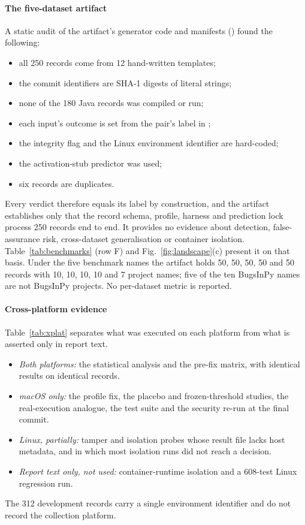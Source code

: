 \paragraph*{The five-dataset artifact} A static audit of the artifact's generator code and manifests () found the following:
\begin{itemize}
\item all 250 records come from 12 hand-written templates;
\item the commit identifiers are SHA-1 digests of literal strings;
\item none of the 180 Java records was compiled or run;
\item each input's outcome is set from the pair's label in ;
\item the integrity flag and the Linux environment identifier are hard-coded;
\item the activation-stub predictor was used;
\item six records are duplicates.
\end{itemize}
Every verdict therefore equals its label by construction, and the artifact establishes only that the record schema, profile, \ers{} harness and prediction lock process 250 records end to end. It provides no evidence about detection, false-assurance risk, cross-dataset generalisation or container isolation. Table~\ref{tab:benchmarks} (row F) and Fig.~\ref{fig:landscape}(c) present it on that basis. Under the five benchmark names the artifact holds 50, 50, 50, 50 and 50 records with 10, 10, 10, 10 and 7 project names; five of the ten BugsInPy names are not BugsInPy projects. No per-dataset metric is reported.

\paragraph*{Cross-platform evidence} Table~\ref{tab:xplat} separates what was executed on each platform from what is asserted only in report text.
\begin{itemize}
\item \emph{Both platforms:} the statistical analysis and the pre-fix \ers{} matrix, with identical results on identical records.
\item \emph{macOS only:} the profile fix, the placebo and frozen-threshold studies, the real-execution \ers{} analogue, the test suite and the security re-run at the final commit.
\item \emph{Linux, partially:} tamper and isolation probes whose result file lacks host metadata, and in which most isolation runs did not reach a decision.
\item \emph{Report text only, not used:} container-runtime isolation and a 608-test Linux regression run.
\end{itemize}
The 312 development records carry a single environment identifier and do not record the collection platform.

